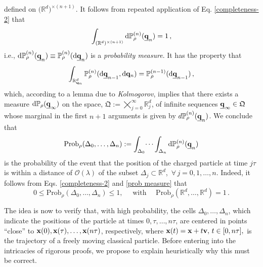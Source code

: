 \documentclass[12pt]{article}
\renewcommand{\d}{{\mathrm d}}
\begin{document}
 defined on $\big(\mathbb{R}^{d}\big)^{\times (n+1)}$. It follows from repeated application of 
 Eq. \eqref{completeness-2} that 
$$ \int_{(\mathbb{R}^{d})^{\times (n+1)}}  \d \mathbb{P}^{(n)}_{\rho}( \underline{{\bf{q}}}_{n}) =1\,,$$
i.e., $ \d\mathbb{P}^{(n)}_{\rho}(\underline{{\bf{q}}}_{n})\equiv \mathbb{P}^{(n)}_{\rho}(\d \underline{\mathbf{q}}_n)$ 
is a \textit{probability measure}. It has the property that
 $$\int_{\mathbb{R}^{d}_{{\bf{q}}_n}} \mathbb{P}^{(n)}_{\rho}(\d \underline{{\bf{q}}}_{n-1}, \d{\bf{q}}_{n}) = 
\mathbb{P}^{(n-1)}_{\rho}(\d \underline{{\bf{q}}}_{n-1})\,,$$
 which, according to a lemma due to \textit{Kolmogorov}, implies that there exists a measure 
 $\d \mathbb{P}_{\rho}(\underline{{\bf{q}}}_{\infty})$ on the space, 
 $\mathfrak{Q}:= \bigtimes_{j=0}^{\infty} \mathbb{R}_{j}^{d}$, of infinite sequences 
 $\underline{{\bf{q}}}_{\infty} \in \mathfrak{Q}$ whose marginal in the first $n+1$ arguments is given by 
 $d\mathbb{P}^{(n)}_{\rho}(\underline{{\bf{q}}}_{n})$. 
 We conclude that
 \begin{equation}\label{probas}
 \text{Prob}_{\rho}(\Delta_0, \dots, \Delta_n):= \int_{\Delta_0} \dots \int_{\Delta_n} \d\mathbb{P}^{(n)}_{\rho}(\underline{{\bf{q}}}_{n})
 \end{equation}
 is the probability of the event that the position of the charged particle at time $j\tau$ is within a distance of $\mathcal{O}(\lambda)$ of the subset $\Delta_j \subset \mathbb{R}^{d}$, \,$\forall \,j=0,1,\dots, n$. Indeed, it follows from Eqs. \eqref{completeness-2} and \eqref{prob measure} that
 \begin{equation}
 0 \leq \text{Prob}_{\rho}(\Delta_0, \dots, \Delta_n) \leq 1, \quad \text{  with  }\quad 
 \text{Prob}_{\rho}(\mathbb{R}^{d}, \dots, \mathbb{R}^{d}) =1\,.
 \end{equation}

 The idea is now to verify that, with high probability, the cells $\Delta_0,\dots, \Delta_n$, which indicate the positions of the particle at times $0, \tau, \dots, n\tau$, are centered in points ``close'' to ${\bf{x}}(0), {\bf{x}}(\tau), \dots , {\bf{x}}(n\tau)$, respectively, where 
 ${\bf{x}}(t)={\bf{x}}+t {\bf{v}},\, t\in [0, n\tau],$ is the trajectory of a freely moving classical particle. Before entering into the intricacies of rigorous proofs, we propose to explain heuristically why this must be correct.
 
\end{document}
